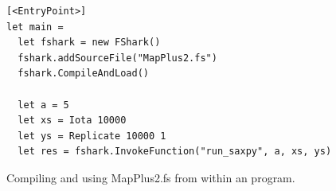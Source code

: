 \begin{figure}[h]
  \centering
\begin{verbatim}
[<EntryPoint>]
let main =
  let fshark = new FShark()
  fshark.addSourceFile("MapPlus2.fs")
  fshark.CompileAndLoad()

  let a = 5
  let xs = Iota 10000
  let ys = Replicate 10000 1
  let res = fshark.InvokeFunction("run_saxpy", a, xs, ys)
\end{verbatim}
  \caption{Compiling and using MapPlus2.fs from within an \fsharp{} program.}
  \label{fig:shortfsharkprogram1}
\end{figure}



